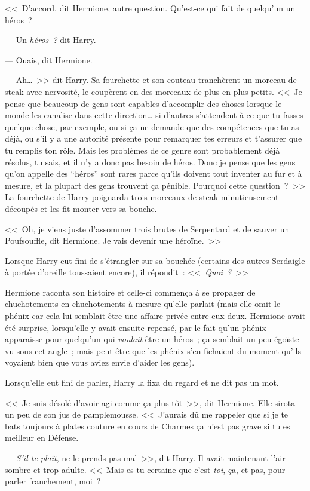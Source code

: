 <<~D'accord, dit Hermione, autre question. Qu'est-ce qui fait de quelqu'un un héros~?

--- Un \emph{héros~?} dit Harry.

--- Ouais, dit Hermione.

--- Ah…~>> dit Harry. Sa fourchette et son couteau tranchèrent un morceau de steak avec nervosité, le coupèrent en des morceaux de plus en plus petits. <<~Je pense que beaucoup de gens sont capables d'accomplir des choses lorsque le monde les canalise dans cette direction… si d'autres s'attendent à ce que tu fasses quelque chose, par exemple, ou si ça ne demande que des compétences que tu as déjà, ou s'il y a une autorité présente pour remarquer tes erreurs et t'assurer que tu remplis ton rôle. Mais les problèmes de ce genre sont probablement déjà résolus, tu sais, et il n'y a donc pas besoin de héros. Donc je pense que les gens qu'on appelle des “héros” sont rares parce qu'ils doivent tout inventer au fur et à mesure, et la plupart des gens trouvent ça pénible. Pourquoi cette question~?~>> La fourchette de Harry poignarda trois morceaux de steak minutieusement découpés et les fit monter vers sa bouche.

<<~Oh, je viens juste d'assommer trois brutes de Serpentard et de sauver un Poufsouffle, dit Hermione. Je vais devenir une héroïne.~>>

Lorsque Harry eut fini de s'étrangler sur sa bouchée (certains des autres Serdaigle à portée d'oreille toussaient encore), il répondit~: <<~\emph{Quoi~?}~>>

Hermione raconta son histoire et celle-ci commença à se propager de chuchotements en chuchotements à mesure qu'elle parlait (mais elle omit le phénix car cela lui semblait être une affaire privée entre eux deux. Hermione avait été surprise, lorsqu'elle y avait ensuite repensé, par le fait qu'un phénix apparaisse pour quelqu'un qui \emph{voulait} être un héros~; ça semblait un peu égoïste vu sous cet angle~; mais peut-être que les phénix s'en fichaient du moment qu'ils voyaient bien que vous aviez envie d'aider les gens).

Lorsqu'elle eut fini de parler, Harry la fixa du regard et ne dit pas un mot.

<<~Je suis désolé d'avoir agi comme ça plus tôt~>>, dit Hermione. Elle sirota un peu de son jus de pamplemousse. <<~J'aurais dû me rappeler que si je te bats toujours à plates couture en cours de Charmes ça n'est pas grave si tu es meilleur en Défense.

--- \emph{S'il te plaît}, ne le prends pas mal~>>, dit Harry. Il avait maintenant l'air sombre et trop-adulte. <<~Mais es-tu certaine que c'est \emph{toi}, ça, et pas, pour parler franchement, moi~?

